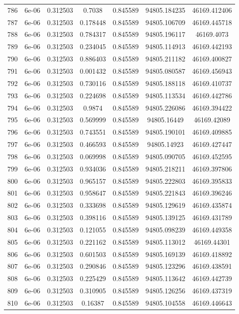 \begin{table}
\begin{tabular*}{\linewidth}{c|c|c|c|c|c|c}
786 & 6e-06 & 0.312503 & 0.7038 & 0.845589 & 94805.184235 & 46169.412406\\
787 & 6e-06 & 0.312503 & 0.178448 & 0.845589 & 94805.106709 & 46169.445718\\
788 & 6e-06 & 0.312503 & 0.784317 & 0.845589 & 94805.196117 & 46169.4073\\
789 & 6e-06 & 0.312503 & 0.234045 & 0.845589 & 94805.114913 & 46169.442193\\
790 & 6e-06 & 0.312503 & 0.886403 & 0.845589 & 94805.211182 & 46169.400827\\
791 & 6e-06 & 0.312503 & 0.001432 & 0.845589 & 94805.080587 & 46169.456943\\
792 & 6e-06 & 0.312503 & 0.730116 & 0.845589 & 94805.188118 & 46169.410737\\
793 & 6e-06 & 0.312503 & 0.224698 & 0.845589 & 94805.113534 & 46169.442786\\
794 & 6e-06 & 0.312503 & 0.9874 & 0.845589 & 94805.226086 & 46169.394422\\
795 & 6e-06 & 0.312503 & 0.569999 & 0.845589 & 94805.16449 & 46169.42089\\
796 & 6e-06 & 0.312503 & 0.743551 & 0.845589 & 94805.190101 & 46169.409885\\
797 & 6e-06 & 0.312503 & 0.466593 & 0.845589 & 94805.14923 & 46169.427447\\
798 & 6e-06 & 0.312503 & 0.069998 & 0.845589 & 94805.090705 & 46169.452595\\
799 & 6e-06 & 0.312503 & 0.934036 & 0.845589 & 94805.218211 & 46169.397806\\
800 & 6e-06 & 0.312503 & 0.965157 & 0.845589 & 94805.222803 & 46169.395833\\
801 & 6e-06 & 0.312503 & 0.958647 & 0.845589 & 94805.221843 & 46169.396246\\
802 & 6e-06 & 0.312503 & 0.333698 & 0.845589 & 94805.129619 & 46169.435874\\
803 & 6e-06 & 0.312503 & 0.398116 & 0.845589 & 94805.139125 & 46169.431789\\
804 & 6e-06 & 0.312503 & 0.121055 & 0.845589 & 94805.098239 & 46169.449358\\
805 & 6e-06 & 0.312503 & 0.221162 & 0.845589 & 94805.113012 & 46169.44301\\
806 & 6e-06 & 0.312503 & 0.601503 & 0.845589 & 94805.169139 & 46169.418892\\
807 & 6e-06 & 0.312503 & 0.290846 & 0.845589 & 94805.123296 & 46169.438591\\
808 & 6e-06 & 0.312503 & 0.225429 & 0.845589 & 94805.113642 & 46169.442739\\
809 & 6e-06 & 0.312503 & 0.310905 & 0.845589 & 94805.126256 & 46169.437319\\
810 & 6e-06 & 0.312503 & 0.16387 & 0.845589 & 94805.104558 & 46169.446643\\
\end{tabular*}
\end{table}
